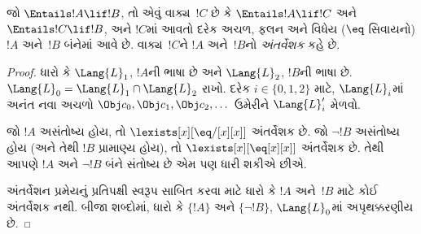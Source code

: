 \begin{thm}[ક્રેગનું અંતર્વેશન પ્રમેય]
જો $\Entails !A \lif !B$, તો એવું વાક્ય~$!C$ છે કે
$\Entails !A \lif !C$ અને $\Entails !C \lif !B$, અને $!C$માં આવતો
દરેક અચળ, ફલન અને વિધેય ($\eq$ સિવાયનો)
$!A$ અને~$!B$ બંનેમાં આવે છે. વાક્ય~$!C$ને $!A$ અને~$!B$નો
\emph{અંતર્વેશક} કહે છે.
\end{thm}

\begin{proof}
ધારો કે $\Lang{L}_1$, $!A$ની ભાષા છે અને $\Lang{L}_2$, $!B$ની ભાષા
છે. $\Lang{L}_0 = \Lang{L}_1 \cap \Lang{L}_2$ રાખો. દરેક $i \in
\{0, 1, 2 \}$ માટે, $\Lang{L}_i$માં અનંત નવા અચળો
$\Obj c_0, \Obj c_1, \Obj c_2, \dots$ ઉમેરીને $\Lang{L}'_i$ મેળવો.

જો $!A$ અસંતોષ્ય હોય, તો $\lexists[x][\eq/[x][x]]$ અંતર્વેશક છે.
જો $\lnot !B$ અસંતોષ્ય હોય (અને તેથી $!B$ પ્રામાણ્ય હોય), તો
$\lexists[x][\eq[x][x]]$ અંતર્વેશક છે. તેથી આપણે $!A$ અને
$\lnot !B$ બંને સંતોષ્ય છે એમ પણ ધારી શકીએ છીએ.

અંતર્વેશન પ્રમેયનું પ્રતિપક્ષી સ્વરૂપ સાબિત કરવા માટે ધારો કે $!A$
અને~$!B$ માટે કોઈ અંતર્વેશક નથી. બીજા શબ્દોમાં, ધારો કે $\{!A\}$ અને
$\{\lnot !B\}$, $\Lang{L}_0$માં અપૃથક્કરણીય છે.


\end{proof}
